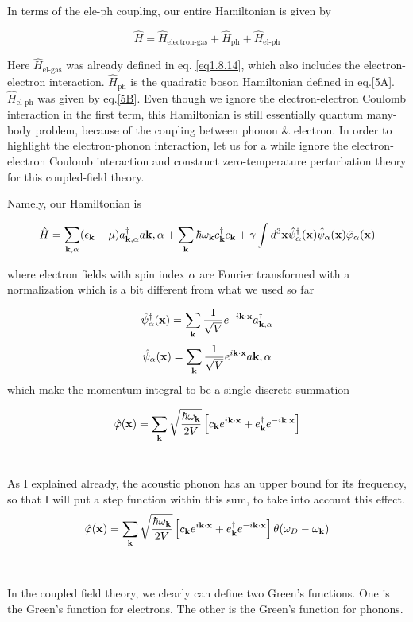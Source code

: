 In terms of the ele-ph coupling, our entire Hamiltonian is given by

\[\hat{H}=\hat{H}_{\text{electron-gas}}+\hat{H}_{\text{ph}}+\hat{H}_{\text{el-ph}} \]

Here $\hat{H}_{\text{el-gas}}$ was already defined in eq. \eqref{eq1.8.14}, which also includes the electron-electron interaction. $\hat{H}_{\text{ph}}$ is the quadratic boson Hamiltonian defined in eq.\eqref{5A}. $\hat{H}_{\text{el-ph}}$ was given by eq.\eqref{5B}. Even though we ignore the electron-electron Coulomb interaction in the first term, this Hamiltonian is still essentially quantum many-body problem, because of the coupling between phonon \& electron. In order to highlight the electron-phonon interaction, let us for a while ignore the electron-electron Coulomb interaction and construct zero-temperature perturbation theory for this coupled-field theory. 

Namely, our Hamiltonian is

\[\hat{H} = \sum_{\bf k,\alpha}(\epsilon_{\bf k}-\mu)a^\dagger_{\bf k,\alpha}a{\bf k,\alpha} + \sum_{\bf k}\hbar\omega_{\bf k}c_{\bf k}^\dagger c_{\bf k} + \gamma\int d^3{\bf x}\hat\psi_\alpha^\dagger({\bf x})\hat\psi_\alpha({\bf x})\hat\varphi_\alpha({\bf x}) \]

where electron fields with spin index $\alpha$ are Fourier transformed with a normalization which is a bit different from what we used so far

\[\hat\psi_\alpha^\dagger({\bf x}) = \sum_{\bf k}\frac{1}{\sqrt{V}}e^{-i\bf k\cdot x}a^\dagger_{\bf k,\alpha} \]
\[\hat\psi_\alpha({\bf x}) = \sum_{\bf k}\frac{1}{\sqrt{V}}e^{i\bf k\cdot x}a{\bf k,\alpha} \]
which make the momentum integral to be a single discrete summation

\[\hat\varphi({\bf x})=\sum_{\bf k}\sqrt{\frac{\hbar\omega_{\bf k}}{2V}}\left[c_{\bf k}e^{i\bf k\cdot x}+e_{\bf k}^\dagger e^{-i\bf k\cdot x}\right] \]
\dotfill
\ 

As I explained already, the acoustic phonon has an upper bound for its frequency, so that I will put a step function within this sum, to take into account this effect. 
\[\hat\varphi({\bf x})=\sum_{\bf k}\sqrt{\frac{\hbar\omega_{\bf k}}{2V}}\left[c_{\bf k}e^{i\bf k\cdot x}+e_{\bf k}^\dagger e^{-i\bf k\cdot x}\right] \theta(\omega_D-\omega_{\bf k}) \]
\dotfill

\ 

In the coupled field theory, we clearly can define two Green's functions. One is the Green's function for electrons. The other is the Green's function for phonons. 


